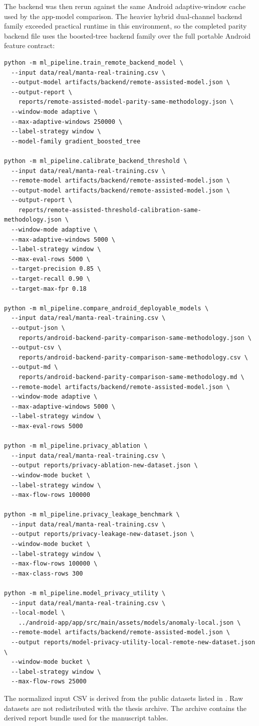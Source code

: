 The backend was then rerun against the same Android adaptive-window cache used by the app-model
comparison. The heavier hybrid dual-channel backend family exceeded practical runtime in this
environment, so the completed parity backend file uses the boosted-tree backend family over the full
portable Android feature contract:
\begin{verbatim}
python -m ml_pipeline.train_remote_backend_model \
  --input data/real/manta-real-training.csv \
  --output-model artifacts/backend/remote-assisted-model.json \
  --output-report \
    reports/remote-assisted-model-parity-same-methodology.json \
  --window-mode adaptive \
  --max-adaptive-windows 250000 \
  --label-strategy window \
  --model-family gradient_boosted_tree

python -m ml_pipeline.calibrate_backend_threshold \
  --input data/real/manta-real-training.csv \
  --remote-model artifacts/backend/remote-assisted-model.json \
  --output-model artifacts/backend/remote-assisted-model.json \
  --output-report \
    reports/remote-assisted-threshold-calibration-same-methodology.json \
  --window-mode adaptive \
  --max-adaptive-windows 5000 \
  --label-strategy window \
  --max-eval-rows 5000 \
  --target-precision 0.85 \
  --target-recall 0.90 \
  --target-max-fpr 0.18

python -m ml_pipeline.compare_android_deployable_models \
  --input data/real/manta-real-training.csv \
  --output-json \
    reports/android-backend-parity-comparison-same-methodology.json \
  --output-csv \
    reports/android-backend-parity-comparison-same-methodology.csv \
  --output-md \
    reports/android-backend-parity-comparison-same-methodology.md \
  --remote-model artifacts/backend/remote-assisted-model.json \
  --window-mode adaptive \
  --max-adaptive-windows 5000 \
  --label-strategy window \
  --max-eval-rows 5000

python -m ml_pipeline.privacy_ablation \
  --input data/real/manta-real-training.csv \
  --output reports/privacy-ablation-new-dataset.json \
  --window-mode bucket \
  --label-strategy window \
  --max-flow-rows 100000

python -m ml_pipeline.privacy_leakage_benchmark \
  --input data/real/manta-real-training.csv \
  --output reports/privacy-leakage-new-dataset.json \
  --window-mode bucket \
  --label-strategy window \
  --max-flow-rows 100000 \
  --max-class-rows 300

python -m ml_pipeline.model_privacy_utility \
  --input data/real/manta-real-training.csv \
  --local-model \
    ../android-app/app/src/main/assets/models/anomaly-local.json \
  --remote-model artifacts/backend/remote-assisted-model.json \
  --output reports/model-privacy-utility-local-remote-new-dataset.json \
  --window-mode bucket \
  --label-strategy window \
  --max-flow-rows 25000
\end{verbatim}

The normalized input CSV is derived from the public datasets listed in .
Raw datasets are not redistributed with the thesis archive. The archive contains the derived report
bundle used for the manuscript tables.
